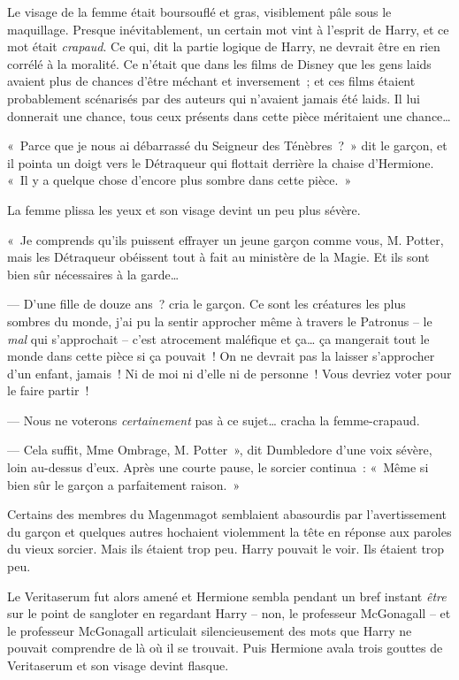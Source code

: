 Le visage de la femme était boursouflé et gras, visiblement pâle sous le maquillage. Presque inévitablement, un certain mot vint à l'esprit de Harry, et ce mot était \emph{crapaud}. Ce qui, dit la partie logique de Harry, ne devrait être en rien corrélé à la moralité. Ce n'était que dans les films de Disney que les gens laids avaient plus de chances d'être méchant et inversement~; et ces films étaient probablement scénarisés par des auteurs qui n'avaient jamais été laids. Il lui donnerait une chance, tous ceux présents dans cette pièce méritaient une chance…

«~Parce que je nous ai débarrassé du Seigneur des Ténèbres~?~» dit le garçon, et il pointa un doigt vers le Détraqueur qui flottait derrière la chaise d'Hermione. «~Il y a quelque chose d'encore plus sombre dans cette pièce.~»

La femme plissa les yeux et son visage devint un peu plus sévère.

«~Je comprends qu'ils puissent effrayer un jeune garçon comme vous, M. Potter, mais les Détraqueur obéissent tout à fait au ministère de la Magie. Et ils sont bien sûr nécessaires à la garde…

--- D'une fille de douze ans~? cria le garçon. Ce sont les créatures les plus sombres du monde, j'ai pu la sentir approcher même à travers le Patronus -- le \emph{mal} qui s'approchait -- c'est atrocement maléfique et ça… ça mangerait tout le monde dans cette pièce si ça pouvait~! On ne devrait pas la laisser s'approcher d'un enfant, jamais~! Ni de moi ni d'elle ni de personne~! Vous devriez voter pour le faire partir~!

--- Nous ne voterons \emph{certainement} pas à ce sujet… cracha la femme-crapaud.

--- Cela suffit, Mme Ombrage, M. Potter~», dit Dumbledore d'une voix sévère, loin au-dessus d'eux. Après une courte pause, le sorcier continua~: «~Même si bien sûr le garçon a parfaitement raison.~»

Certains des membres du Magenmagot semblaient abasourdis par l'avertissement du garçon et quelques autres hochaient violemment la tête en réponse aux paroles du vieux sorcier. Mais ils étaient trop peu. Harry pouvait le voir. Ils étaient trop peu.

Le Veritaserum fut alors amené et Hermione sembla pendant un bref instant \emph{être} sur le point de sangloter en regardant Harry -- non, le professeur McGonagall -- et le professeur McGonagall articulait silencieusement des mots que Harry ne pouvait comprendre de là où il se trouvait. Puis Hermione avala trois gouttes de Veritaserum et son visage devint flasque.

